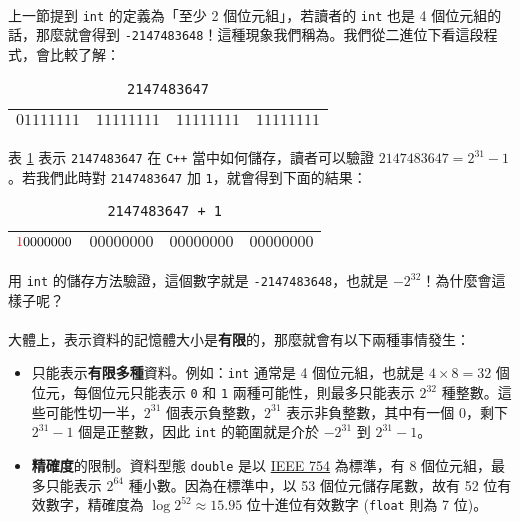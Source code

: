 \documentclass[12pt,a4paper,oneside]{report}
\begin{document}
\begin{CJK}{UTF8}{bkai}
\paragraph{}上一節提到 \lstinline!int! 的定義為「至少 2 個位元組」，若讀者的 \lstinline!int! 也是 4 個位元組的話，那麼就會得到 \lstinline!-2147483648!！這種現象我們稱為。我們從二進位下看這段程式，會比較了解：

\begin{table}[h!]
\centering
\begin{tabular}{|c|c|c|c|}
\hline
$01111111$ & $11111111$ & $11111111$ & $11111111$\\
\hline
\end{tabular}
\caption{\lstinline!2147483647!}
\label{program:struct:table:binary:2147483647}
\end{table}

\paragraph{}表 \ref{program:struct:table:binary:2147483647} 表示 \lstinline!2147483647! 在 \texttt{C++} 當中如何儲存，讀者可以驗證 $2147483647=2^{31}-1$。若我們此時對 \lstinline!2147483647! 加 \lstinline!1!，就會得到下面的結果：

\begin{table}[h!]
\centering
\begin{tabular}{|c|c|c|c|}
\hline
${\color{red}1}0000000$ & $00000000$ & $00000000$ & $00000000$\\
\hline
\end{tabular}
\caption{\lstinline!2147483647 + 1!}
\end{table}

\paragraph{}用 \lstinline!int! 的儲存方法驗證，這個數字就是 \lstinline!-2147483648!，也就是 $-2^{32}$！為什麼會這樣子呢？
\paragraph{}大體上，表示資料的記憶體大小是\textbf{有限}的，那麼就會有以下兩種事情發生：
\begin{itemize}
\item 只能表示\textbf{有限多種}資料。例如：\lstinline!int! 通常是 4 個位元組，也就是 $4\times{8}=32$ 個位元，每個位元只能表示 \lstinline!0! 和 \lstinline!1! 兩種可能性，則最多只能表示 $2^{32}$ 種整數。這些可能性切一半，$2^{31}$ 個表示負整數，$2^{31}$ 表示非負整數，其中有一個 $0$，剩下 $2^{31}-1$ 個是正整數，因此 \lstinline!int! 的範圍就是介於 $-2^{31}$ 到 $2^{31}-1$。
\item \textbf{精確度}的限制。資料型態 \lstinline!double! 是以 \href{https://zh.wikipedia.org/wiki/IEEE_754}{IEEE 754} 為標準，有 8 個位元組，最多只能表示 $2^{64}$ 種小數。因為在標準中，以 53 個位元儲存尾數，故有 52 位有效數字，精確度為 $\log{2^{52}}\approx{15.95}$ 位十進位有效數字 (\lstinline!float! 則為 7 位)。
\end{itemize}


\end{CJK}
\end{document}
